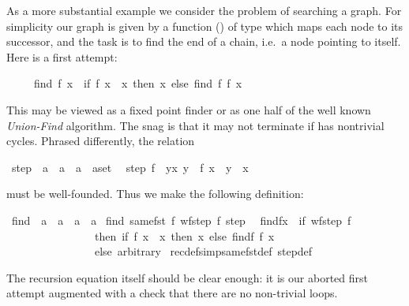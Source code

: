 \begin{isabellebody}
\begin{isamarkuptext}
As a more substantial example we consider the problem of searching a graph.
For simplicity our graph is given by a function () of
type  which
maps each node to its successor, and the task is to find the end of a chain,
i.e.\ a node pointing to itself. Here is a first attempt:
\begin{isabelle}%
\ \ \ \ \ find\ {\isacharparenleft}f{\isacharcomma}\ x{\isacharparenright}\ {\isacharequal}\ {\isacharparenleft}if\ f\ x\ {\isacharequal}\ x\ then\ x\ else\ find\ {\isacharparenleft}f{\isacharcomma}\ f\ x{\isacharparenright}{\isacharparenright}%
\end{isabelle}
This may be viewed as a fixed point finder or as one half of the well known
\emph{Union-Find} algorithm.
The snag is that it may not terminate if  has nontrivial cycles.
Phrased differently, the relation%
\end{isamarkuptext}%
\ step{}\ {\isacharcolon}{\isacharcolon}\ {\isachardoublequote}{\isacharparenleft}{\isacharprime}a\ {\isasymRightarrow}\ {\isacharprime}a{\isacharparenright}\ {\isasymRightarrow}\ {\isacharparenleft}{\isacharprime}a\ {\isasymtimes}\ {\isacharprime}a{\isacharparenright}set{\isachardoublequote}\isanewline
\ \ {\isachardoublequote}step{}\ f\ {\isasymequiv}\ {\isacharbraceleft}{\isacharparenleft}y{\isacharcomma}x{\isacharparenright}{\isachardot}\ y\ {\isacharequal}\ f\ x\ {\isasymand}\ y\ {\isasymnoteq}\ x{\isacharbraceright}{\isachardoublequote}%
\begin{isamarkuptext}%
\noindent
must be well-founded. Thus we make the following definition:%
\end{isamarkuptext}%
\ find\ {\isacharcolon}{\isacharcolon}\ {\isachardoublequote}{\isacharparenleft}{\isacharprime}a\ {\isasymRightarrow}\ {\isacharprime}a{\isacharparenright}\ {\isasymtimes}\ {\isacharprime}a\ {\isasymRightarrow}\ {\isacharprime}a{\isachardoublequote}\isanewline
{}\ find\ {\isachardoublequote}same{\isacharunderscore}fst\ {\isacharparenleft}{\isasymlambda}f{\isachardot}\ wf{\isacharparenleft}step{}\ f{\isacharparenright}{\isacharparenright}\ step{}{\isachardoublequote}\isanewline
\ \ {\isachardoublequote}find{\isacharparenleft}f{\isacharcomma}x{\isacharparenright}\ {\isacharequal}\ {\isacharparenleft}if\ wf{\isacharparenleft}step{}\ f{\isacharparenright}\isanewline
\ \ \ \ \ \ \ \ \ \ \ \ \ \ \ \ then\ if\ f\ x\ {\isacharequal}\ x\ then\ x\ else\ find{\isacharparenleft}f{\isacharcomma}\ f\ x{\isacharparenright}\isanewline
\ \ \ \ \ \ \ \ \ \ \ \ \ \ \ \ else\ arbitrary{\isacharparenright}{\isachardoublequote}\isanewline
{\isacharparenleft}\ recdef{\isacharunderscore}simp{\isacharcolon}same{\isacharunderscore}fst{\isacharunderscore}def\ step{}{\isacharunderscore}def{\isacharparenright}%
\begin{isamarkuptext}%
\noindent
The recursion equation itself should be clear enough: it is our aborted
first attempt augmented with a check that there are no non-trivial loops.


\end{isamarkuptext}
\end{isabellebody}

